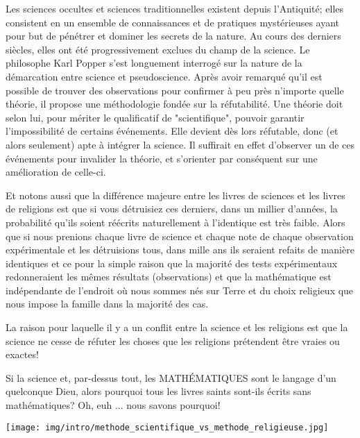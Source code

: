 	Les sciences occultes et sciences traditionnelles existent depuis l'Antiquit\'e; elles consistent en un ensemble de connaissances et de pratiques myst\'erieuses ayant pour but de p\'en\'etrer et dominer les secrets de la nature. Au cours des derniers siècles, elles ont \'et\'e progressivement exclues du champ de la science. Le philosophe Karl Popper s'est longuement interrog\'e sur la nature de la d\'emarcation entre science et pseudoscience. Après avoir remarqu\'e qu'il est possible de trouver des observations pour confirmer à peu près n'importe quelle th\'eorie, il propose une m\'ethodologie fond\'ee sur la r\'efutabilit\'e. Une th\'eorie doit selon lui, pour m\'eriter le qualificatif de "scientifique", pouvoir garantir l'impossibilit\'e de certains \'ev\'enements. Elle devient dès lors r\'efutable, donc (et alors seulement) apte à int\'egrer la science. Il suffirait en effet d'observer un de ces \'ev\'enements pour invalider la th\'eorie, et s'orienter par cons\'equent sur une am\'elioration de celle-ci.
	
	Et notons aussi que la diff\'erence majeure entre les livres de sciences et les livres de religions est que si vous d\'etruisiez ces derniers, dans un millier d'ann\'ees, la probabilit\'e qu'ils soient r\'e\'ecrits naturellement à l'identique est très faible. Alors que si nous prenions chaque livre de science et chaque note de chaque observation exp\'erimentale et les d\'etruisions tous, dans mille ans ils seraient refaits de manière identiques et ce pour la simple raison que la majorit\'e des tests exp\'erimentaux redonneraient les mêmes r\'esultats (observations) et que la math\'ematique est ind\'ependante de l'endroit où nous sommes n\'es sur Terre et du choix religieux que nous impose la famille dans la majorit\'e des cas.
	\begin{fquote}La raison pour laquelle il y a un conflit entre la science et les religions est que la science ne cesse de réfuter les choses que les religions prétendent être vraies ou exactes!
	\end{fquote}
	\begin{tcolorbox}[title=Remarque,colframe=black,arc=10pt]
	Si la science et, par-dessus tout, les MATHÉMATIQUES sont le langage d'un quelconque Dieu, alors pourquoi tous les livres saints sont-ils écrits sans mathématiques? Oh, euh ... nous savons pourquoi!
	\end{tcolorbox}
	
	\begin{center}
		\texttt{[image: img/intro/methode\_scientifique\_vs\_methode\_religieuse.jpg]}
	\end{center}
	
